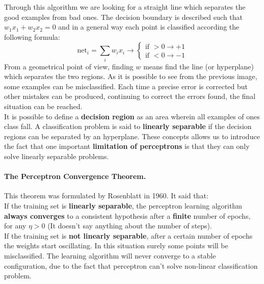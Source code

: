 Through this algorithm we are looking for a straight line which separates the good examples from bad ones. The decision boundary is described such that $w_1x_1 + w_2x_2 = 0$ and in a general way each point is classified according the following formula:
$$\text{net}_i = \sum_i w_ix_i \rightarrow \begin{cases}
\text{if } >0 \rightarrow +1\\
\text{if } <0 \rightarrow -1
\end{cases}$$
From a geometrical point of view, finding $w$ means find the line (or hyperplane) which separates the two regions.
As it is possible to see from the previous image, some examples can be misclassified. Each time a precise error is corrected but other mistakes can be produced, continuing to correct the errors found, the final situation can be reached.\\
It is possible to define a \textbf{decision region} as an area wherein all examples of ones class fall. A classification problem is said to \textbf{linearly separable} if the decision regions can be separated by an hyperplane. These concepts allows us to introduce the fact that one important \textbf{limitation of perceptrons} is that they can only solve linearly separable problems.

\paragraph*{The Perceptron Convergence Theorem.} This theorem was formulated by Rosenblatt in 1960. It said that:\\
If the training set is \textbf{linearly separable}, the perceptron learning algorithm \textbf{always converges} to a consistent hypothesis after a \textbf{finite} number of epochs, for any $\eta > 0$ (It doesn't say anything about the number of steps).\\
If the training set is \textbf{not linearly separable}, after a certain number of epochs the weights start oscillating. In this situation surely some points will be misclassified. The learning algorithm will never converge to a stable configuration, due to the fact that perceptron can't solve non-linear classification problem.

\par \bigskip \noindent
